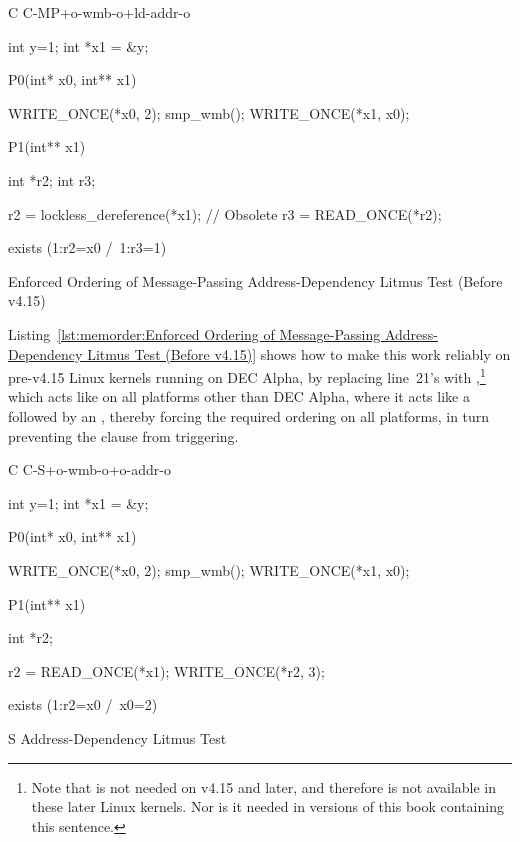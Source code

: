 \begin{listing}[tbp]
{ \scriptsize
\begin{verbbox}[\LstLineNo]
C C-MP+o-wmb-o+ld-addr-o

{
int y=1;
int *x1 = &y;
}

P0(int* x0, int** x1) {

  WRITE_ONCE(*x0, 2);
  smp_wmb();
  WRITE_ONCE(*x1, x0);

}

P1(int** x1) {

  int *r2;
  int r3;

  r2 = lockless_dereference(*x1); // Obsolete
  r3 = READ_ONCE(*r2);

}

exists (1:r2=x0 /\ 1:r3=1)
\end{verbbox}
}
\centering
\theverbbox
\caption{Enforced Ordering of Message-Passing Address-Dependency Litmus Test (Before v4.15)}
\label{lst:memorder:Enforced Ordering of Message-Passing Address-Dependency Litmus Test (Before v4.15)}
\end{listing}

Listing~\ref{lst:memorder:Enforced Ordering of Message-Passing Address-Dependency Litmus Test (Before v4.15)}
shows how to make this work reliably on pre-v4.15 Linux kernels running on
DEC Alpha, by
replacing line~21's  with ,\footnote{
	Note that  is not needed on v4.15 and
	later, and therefore is not available in these later Linux kernels.
	Nor is it needed in versions of this book containing this sentence.}
which acts like  on all platforms other than DEC Alpha,
where it acts like a  followed by an ,
thereby forcing the required ordering on all platforms, in turn
preventing the  clause from triggering.

\begin{listing}[tbp]
{ \scriptsize
\begin{verbbox}[\LstLineNo]
C C-S+o-wmb-o+o-addr-o

{
int y=1;
int *x1 = &y;
}

P0(int* x0, int** x1) {

  WRITE_ONCE(*x0, 2);
  smp_wmb();
  WRITE_ONCE(*x1, x0);

}

P1(int** x1) {

  int *r2;

  r2 = READ_ONCE(*x1);
  WRITE_ONCE(*r2, 3);

}

exists (1:r2=x0 /\ x0=2)
\end{verbbox}
}
\centering
\theverbbox
\caption{S Address-Dependency Litmus Test}
\label{lst:memorder:S Address-Dependency Litmus Test}
\end{listing}

